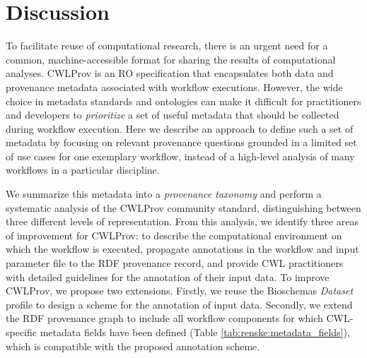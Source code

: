 \section{Discussion}
To facilitate reuse of computational research, there is an urgent need for a common, machine-accessible format for sharing the results of computational analyses. CWLProv \cite{khan-sharing-2019} is an RO specification that encapsulates both data and provenance metadata associated with workflow executions.
However, the wide choice in metadata standards and ontologies can make it difficult for practitioners and developers to \emph{prioritize} a set of useful metadata that should be collected during workflow execution.
Here we describe an approach to define such a set of metadata by focusing on relevant provenance questions grounded in a limited set of use cases for one exemplary workflow, instead of a high-level analysis of many workflows in a particular discipline. 

We summarize this metadata into a \emph{provenance taxonomy} and perform a systematic analysis of the CWLProv community standard, distinguishing between three different levels of representation. From this analysis, we identify three areas of improvement for CWLProv: to describe the computational environment on which the workflow is executed, propagate annotations in the workflow and input parameter file to the RDF provenance record, and provide CWL practitioners with detailed guidelines for the annotation of their input data. To improve CWLProv, we propose two extensions. Firstly, we reuse the Bioschemas \cite{Michel_2018} \emph{Dataset} profile to design a scheme for the annotation of input data. Secondly, we extend the RDF provenance graph to include all workflow components for which CWL-specific metadata fields have been defined (Table \ref{tab:renske:metadata_fields}), which is compatible with the proposed annotation scheme. 

